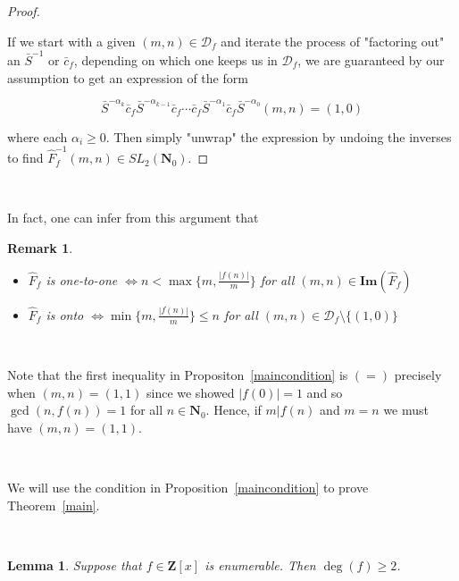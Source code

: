\documentclass{article}
\newtheorem{lemma}[theorem]{Lemma}  %
\newtheorem{remark}[theorem]{Remark}  %
\begin{document}
\begin{proof}
\

If we start with a given $(m, n) \in \mathcal{D}_f$ and iterate the process of "factoring out" an $\bar{S}^{-1}$ or $\bar{c}_f$, depending on which one keeps us in $\mathcal{D}_f$, we are guaranteed by our assumption to get an expression of the form

$$\bar{S}^{-\alpha_k} \bar{c}_f \bar{S}^{-\alpha_{k-1}} \bar{c}_f \cdots \bar{c}_f \bar{S}^{-\alpha_1} \bar{c}_f \bar{S}^{-\alpha_0}(m,n) = (1,0)$$

where each $\alpha_i \geq 0$. Then simply "unwrap" the expression by undoing the inverses to find $\hat{F}_f^{-1}(m, n) \in SL_2(\mathbf{N}_0)$.


\end{proof}

\

In fact, one can infer from this argument that

\begin{remark}\label{onto, one-to-one}

\begin{itemize}

\

    \item $\hat{F}_f$ is one-to-one $\iff n < \max \{m, \frac{|f(n)|}{m} \}$ for all $(m, n) \in \mathbf{Im}(\hat{F}_f)$ \\
    \item $\hat{F}_f$ is onto $\iff \min \{m, \frac{|f(n)|}{m} \} \leq n$ for all $(m, n) \in \mathcal{D}_f \setminus \{(1,0)\}$
\end{itemize}
\end{remark}

\

Note that the first inequality in Propositon~\ref{maincondition} is $(=)$ precisely when $(m, n) = (1, 1)$ since we showed $|f(0)| = 1$ and so $\gcd(n, f(n)) = 1$ for all $n \in \mathbf{N}_0$. Hence, if $m \lvert f(n)$ and $m = n$ we must have $(m, n) = (1,1)$.

\

We will use the condition in Proposition~\ref{maincondition} to prove Theorem~\ref{main}.  

\

\begin{lemma}
Suppose that $f \in \mathbf{Z}[x]$ is enumerable. Then $\deg(f) \geq 2$.
\end{lemma}
\end{document}

